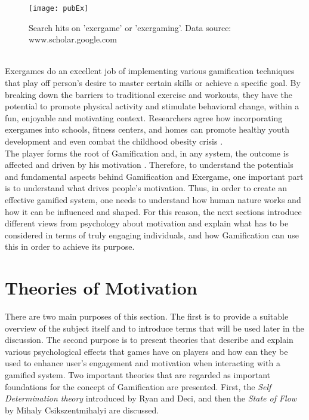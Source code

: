 \begin{figure}[h]
    \centering
    \texttt{[image: pubEx]}
    \caption{Search hits on 'exergame' or 'exergaming'. Data source: www.scholar.google.com}
    \label{fig:pubEx}
\end{figure}\\
Exergames do an excellent job of implementing various gamification techniques that play off person's desire to master certain skills or achieve a specific goal. By breaking down the barriers to traditional exercise and workouts, they have the potential to promote physical activity and stimulate behavioral change, within a fun, enjoyable and motivating context. Researchers agree how incorporating exergames into schools, fitness centers, and homes can promote healthy youth development and even combat the childhood obesity crisis \cite{staiano2011exergames}. \\
The player forms the root of Gamification and, in any system, the outcome is affected and driven by his motivation \cite{zichermann2011gamification}. Therefore, to understand the potentials and fundamental aspects behind Gamification and Exergame, one important part is to understand what drives people's motivation. Thus, in  order  to  create  an  effective  gamified system, one needs to understand  how  human  nature  works  and  how  it can be influenced and shaped. For this reason, the next sections introduce different views from psychology about motivation and explain what has to be considered in terms of truly engaging individuals, and how Gamification can use this in order to achieve its purpose. 
\pagebreak
\section{Theories of Motivation}
\label{chapter:motivation}
There are two main purposes of this section. The first is to provide a suitable overview of the subject itself and to introduce terms that will be used later in the discussion. The second purpose is to present theories that describe and explain various psychological effects that games have on players and how can they be used to enhance user's engagement and motivation when interacting with a gamified system. Two important theories that are regarded as important foundations for  the  concept of Gamification are presented. First, the \textit{Self Determination theory} introduced by Ryan and Deci, and then the \textit{State of Flow} by Mihaly Csikszentmihalyi are discussed. 
